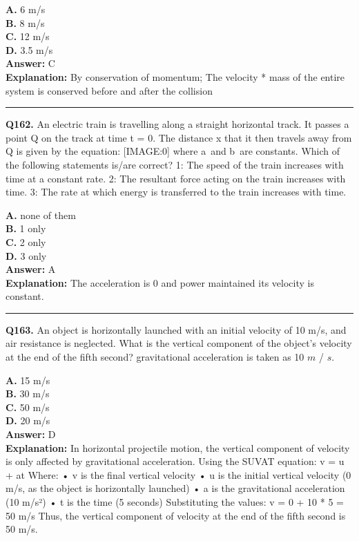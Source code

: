 \documentclass[12pt]{article}
\begin{document}
\textbf{A.} 6 m/s \\
\textbf{B.} 8 m/s \\
\textbf{C.} 12 m/s \\
\textbf{D.} 3.5 m/s \\

\textbf{Answer:} C \\
\textbf{Explanation:} By conservation of momentum; The velocity * mass of the entire system is conserved before and after the collision

\hrule
\vspace{1em}


\noindent
\textbf{Q162.} An electric train is travelling along a straight horizontal track. It passes a point Q on the track at time t = 0. The distance x that it then travels away from Q is given by the equation:
[IMAGE:0]
where a and b are constants.
Which of the following statements is/are correct?
1: The speed of the train increases with time at a constant rate.
2: The resultant force acting on the train increases with time.
3: The rate at which energy is transferred to the train increases with time.



\textbf{A.} none of them \\
\textbf{B.} 1 only \\
\textbf{C.} 2 only \\
\textbf{D.} 3 only \\

\textbf{Answer:} A \\
\textbf{Explanation:} The acceleration is 0 and power maintained its velocity is constant.

\hrule
\vspace{1em}


\noindent
\textbf{Q163.} An object is horizontally launched with an initial velocity of 10 m/s, and air resistance is neglected. What is the vertical component of the object's velocity at the end of the fifth second? gravitational acceleration is taken as 10
$𝑚$
/
$𝑠$.



\textbf{A.} 15 m/s \\
\textbf{B.} 30 m/s \\
\textbf{C.} 50 m/s \\
\textbf{D.} 20 m/s \\

\textbf{Answer:} D \\
\textbf{Explanation:} In horizontal projectile motion, the vertical component of velocity is only affected by gravitational acceleration. Using the SUVAT equation: v = u + at Where:
• v is the final vertical velocity
• u is the initial vertical velocity (0 m/s, as the object is horizontally launched)
• a is the gravitational acceleration (10 m/s²)
• t is the time (5 seconds) Substituting the values: v = 0 + 10 * 5 = 50 m/s Thus, the vertical component of velocity at the end of the fifth second is 50 m/s.
\end{document}

